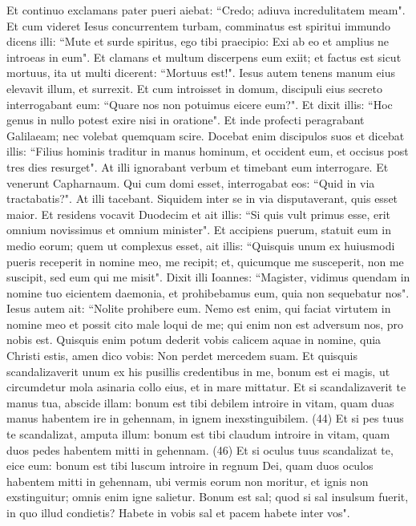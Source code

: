 \begin{biblechapter}
\verse Et continuo exclamans pater pueri aiebat: “Credo; adiuva incredulitatem meam".  
\verse Et cum videret Iesus concurrentem turbam, comminatus est spiritui immundo dicens illi: “Mute et surde spiritus, ego tibi praecipio: Exi ab eo et amplius ne introeas in eum". 
\verse Et clamans et multum discerpens eum exiit; et factus est sicut mortuus, ita ut multi dicerent: “Mortuus est!". 
\verse Iesus autem tenens manum eius elevavit illum, et surrexit. 
\verse Et cum introisset in domum, discipuli eius secreto interrogabant eum: “Quare nos non potuimus eicere eum?". 
\verse Et dixit illis: “Hoc genus in nullo potest exire nisi in oratione". 
\verse Et inde profecti peragrabant Galilaeam; nec volebat quemquam scire. 
\verse Docebat enim discipulos suos et dicebat illis: “Filius hominis traditur in manus hominum, et occident eum, et occisus post tres dies resurget". 
\verse At illi ignorabant verbum et timebant eum interrogare. 
\verse Et venerunt Capharnaum. Qui cum domi esset, interrogabat eos: “Quid in via tractabatis?". 
\verse At illi tacebant. Siquidem inter se in via disputaverant, quis esset maior. 
\verse Et residens vocavit Duodecim et ait illis: “Si quis vult primus esse, erit omnium novissimus et omnium minister". 
\verse Et accipiens puerum, statuit eum in medio eorum; quem ut complexus esset, ait illis: 
\verse “Quisquis unum ex huiusmodi pueris receperit in nomine meo, me recipit; et, quicumque me susceperit, non me suscipit, sed eum qui me misit". 
\verse Dixit illi Ioannes: “Magister, vidimus quendam in nomine tuo eicientem daemonia, et prohibebamus eum, quia non sequebatur nos". 
\verse Iesus autem ait: “Nolite prohibere eum. Nemo est enim, qui faciat virtutem in nomine meo et possit cito male loqui de me; 
\verse qui enim non est adversum nos, pro nobis est. 
\verse Quisquis enim potum dederit vobis calicem aquae in nomine, quia Christi estis, amen dico vobis: Non perdet mercedem suam. 
\verse Et quisquis scandalizaverit unum ex his pusillis credentibus in me, bonum est ei magis, ut circumdetur mola asinaria collo eius, et in mare mittatur. 
\verse Et si scandalizaverit te manus tua, abscide illam: bonum est tibi debilem introire in vitam, quam duas manus habentem ire in gehennam, in ignem inexstinguibilem. (44) 
\verse Et si pes tuus te scandalizat, amputa illum: bonum est tibi claudum introire in vitam, quam duos pedes habentem mitti in gehennam. (46) 
\verse Et si oculus tuus scandalizat te, eice eum: bonum est tibi luscum introire in regnum Dei, quam duos oculos habentem mitti in gehennam, 
\verse ubi vermis eorum non moritur, et ignis non exstinguitur; 
\verse omnis enim igne salietur. 
\verse Bonum est sal; quod si sal insulsum fuerit, in quo illud condietis? Habete in vobis sal et pacem habete inter vos". 
\end{biblechapter}


